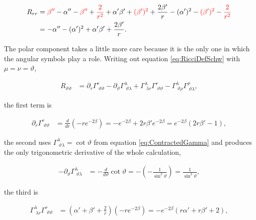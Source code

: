         \begin{align*}
            R_{rr} &= {\color{red}\beta''} - \alpha'' - {\color{red}\beta''} + {\color{red}\frac{2}{r^2}} + \alpha'\beta' + {\color{red}(\beta')^2} + \frac{2\beta'}{r} - (\alpha')^2 - {\color{red}(\beta')^2} - {\color{red}\frac{2}{r^2}}\\
            &= -\alpha'' - (\alpha')^2 + \alpha'\beta' + \frac{2\beta'}{r}.
        \end{align*}

        The polar component takes a little more care because it is the only one in which the angular symbols play a role. Writing out equation \ref{eq:RicciDefSchw} with $\mu=\nu=\vartheta$,

        \begin{align*}
            R_{\vartheta\vartheta} &= \partial_r\Gamma^{r}_{\;\vartheta\vartheta} - \partial_{\vartheta}\Gamma^{\lambda}_{\;\vartheta\lambda} + \Gamma^{\lambda}_{\;\lambda r}\Gamma^{r}_{\;\vartheta\vartheta} - \Gamma^{\lambda}_{\;\vartheta\rho}\Gamma^{\rho}_{\;\vartheta\lambda},
        \end{align*}

        the first term is

        \begin{align*}
            \partial_r\Gamma^{r}_{\;\vartheta\vartheta} &= \frac{d}{dr}\left(-re^{-2\beta}\right) = -e^{-2\beta} + 2r\beta'e^{-2\beta} = e^{-2\beta}\left(2r\beta' - 1\right),
        \end{align*}

        the second uses $\Gamma^{\lambda}_{\;\vartheta\lambda} = \cot\vartheta$ from equation \ref{eq:ContractedGamma} and produces the only trigonometric derivative of the whole calculation,

        \begin{align*}
            -\partial_{\vartheta}\Gamma^{\lambda}_{\;\vartheta\lambda} &= -\frac{d}{d\vartheta}\cot\vartheta = -\left(-\frac{1}{\sin^2\vartheta}\right) = \frac{1}{\sin^2\vartheta},
        \end{align*}

        the third is

        \begin{align*}
            \Gamma^{\lambda}_{\;\lambda r}\Gamma^{r}_{\;\vartheta\vartheta} &= \left(\alpha'+\beta'+\frac{2}{r}\right)\left(-re^{-2\beta}\right) = -e^{-2\beta}\left(r\alpha' + r\beta' + 2\right),
        \end{align*}

